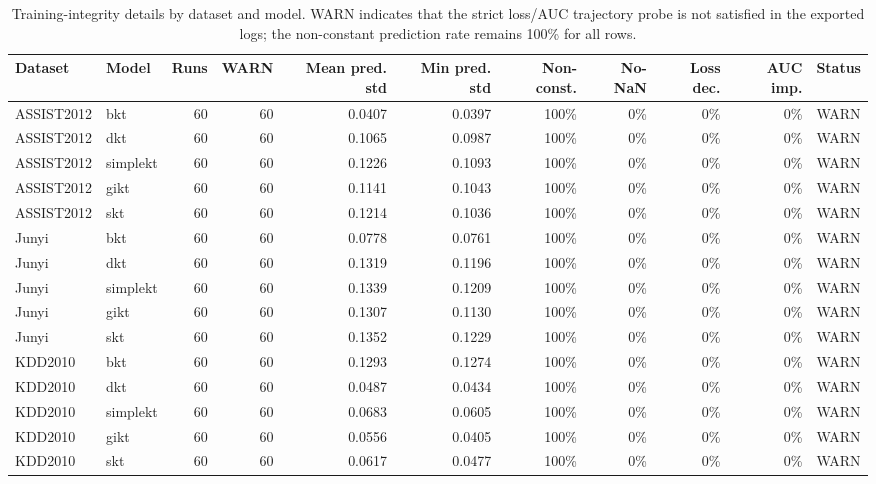 \documentclass[11pt,a4paper]{article}
\begin{document}
\begin{table}[H]
\centering
\caption{Training-integrity details by dataset and model. WARN indicates that the strict loss/AUC trajectory probe is not satisfied in the exported logs; the non-constant prediction rate remains 100\% for all rows.}
\label{tab:training-model}
\scriptsize
\begin{adjustbox}{max width=\textwidth}
\begin{tabular}{llrrrrrrrrl}
\toprule
Dataset & Model & Runs & WARN & Mean pred. std & Min pred. std & Non-const. & No-NaN & Loss dec. & AUC imp. & Status \\
\midrule
ASSIST2012 & bkt & 60 & 60 & 0.0407 & 0.0397 & 100\% & 0\% & 0\% & 0\% & WARN \\
ASSIST2012 & dkt & 60 & 60 & 0.1065 & 0.0987 & 100\% & 0\% & 0\% & 0\% & WARN \\
ASSIST2012 & simplekt & 60 & 60 & 0.1226 & 0.1093 & 100\% & 0\% & 0\% & 0\% & WARN \\
ASSIST2012 & gikt & 60 & 60 & 0.1141 & 0.1043 & 100\% & 0\% & 0\% & 0\% & WARN \\
ASSIST2012 & skt & 60 & 60 & 0.1214 & 0.1036 & 100\% & 0\% & 0\% & 0\% & WARN \\
Junyi & bkt & 60 & 60 & 0.0778 & 0.0761 & 100\% & 0\% & 0\% & 0\% & WARN \\
Junyi & dkt & 60 & 60 & 0.1319 & 0.1196 & 100\% & 0\% & 0\% & 0\% & WARN \\
Junyi & simplekt & 60 & 60 & 0.1339 & 0.1209 & 100\% & 0\% & 0\% & 0\% & WARN \\
Junyi & gikt & 60 & 60 & 0.1307 & 0.1130 & 100\% & 0\% & 0\% & 0\% & WARN \\
Junyi & skt & 60 & 60 & 0.1352 & 0.1229 & 100\% & 0\% & 0\% & 0\% & WARN \\
KDD2010 & bkt & 60 & 60 & 0.1293 & 0.1274 & 100\% & 0\% & 0\% & 0\% & WARN \\
KDD2010 & dkt & 60 & 60 & 0.0487 & 0.0434 & 100\% & 0\% & 0\% & 0\% & WARN \\
KDD2010 & simplekt & 60 & 60 & 0.0683 & 0.0605 & 100\% & 0\% & 0\% & 0\% & WARN \\
KDD2010 & gikt & 60 & 60 & 0.0556 & 0.0405 & 100\% & 0\% & 0\% & 0\% & WARN \\
KDD2010 & skt & 60 & 60 & 0.0617 & 0.0477 & 100\% & 0\% & 0\% & 0\% & WARN \\
\bottomrule
\end{tabular}
\end{adjustbox}
\end{table}
\end{document}
